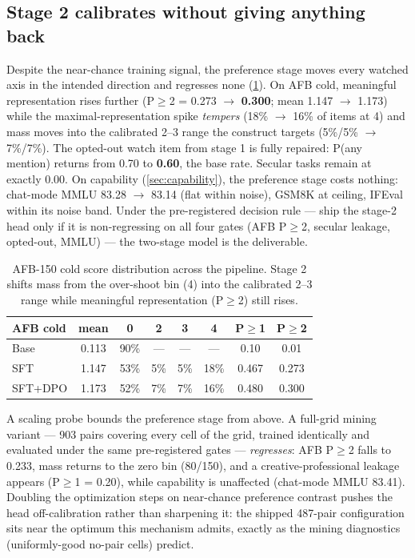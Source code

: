 \documentclass[11pt]{article}
\begin{document}
\subsection{Stage 2 calibrates without giving anything back}\label{sec:dporesults}

Despite the near-chance training signal, the preference stage moves every
watched axis in the intended direction and regresses none
(\cref{tab:dpo}). On AFB cold, meaningful representation rises further
(P$\ge$2 = 0.273 $\to$ \textbf{0.300}; mean 1.147 $\to$ 1.173) while the
maximal-representation spike \emph{tempers} (18\% $\to$ 16\% of items at
4) and mass moves into the calibrated 2--3 range the construct targets
(5\%/5\% $\to$ 7\%/7\%). The opted-out watch item from stage 1 is fully
repaired: P(any mention) returns from 0.70 to \textbf{0.60}, the base
rate. Secular tasks remain at exactly 0.00. On capability
(\cref{sec:capability}), the preference stage costs nothing: chat-mode
MMLU 83.28 $\to$ 83.14 (flat within noise), GSM8K at ceiling, IFEval
within its noise band. Under the pre-registered decision
rule --- ship the stage-2 head only if it is non-regressing on all four
gates (AFB P$\ge$2, secular leakage, opted-out, MMLU) --- the two-stage
model is the deliverable.

\begin{table}[ht]
\centering
\small
\begin{tabular}{lccccccc}
\toprule
AFB cold & mean & 0 & 2 & 3 & 4 & P$\ge$1 & P$\ge$2 \\
\midrule
Base & 0.113 & 90\% & --- & --- & --- & 0.10 & 0.01 \\
SFT & 1.147 & 53\% & 5\% & 5\% & 18\% & 0.467 & 0.273 \\
SFT+DPO & 1.173 & 52\% & 7\% & 7\% & 16\% & 0.480 & 0.300 \\
\bottomrule
\end{tabular}
\caption{AFB-150 cold score distribution across the pipeline. Stage 2
shifts mass from the over-shoot bin (4) into the calibrated 2--3 range
while meaningful representation (P$\ge$2) still rises.}
\label{tab:dpo}
\end{table}

A scaling probe bounds the preference stage from above. A full-grid
mining variant --- 903 pairs covering every cell of the grid, trained
identically and evaluated under the same pre-registered gates ---
\emph{regresses}: AFB P$\ge$2 falls to 0.233, mass returns to the zero
bin (80/150), and a creative-professional leakage appears (P$\ge$1 =
0.20), while capability is unaffected (chat-mode MMLU 83.41). Doubling
the optimization steps on near-chance preference contrast pushes the
head off-calibration rather than sharpening it: the shipped 487-pair
configuration sits near the optimum this mechanism admits, exactly as
the mining diagnostics (uniformly-good no-pair cells) predict.
\end{document}
